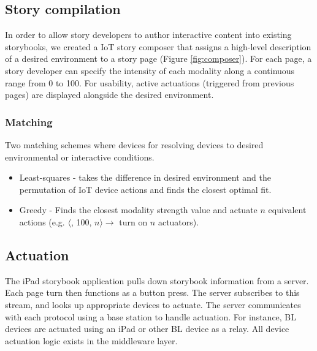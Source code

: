 \documentclass{sigchi}
\newcommand*{\quoted}[1]{{\small{\fontfamily{cmss}\selectfont{#1}}}}
\begin{document}
\subsection{Story compilation}
In order to allow story developers to author interactive content into existing storybooks, we created a IoT story composer that assigns a high-level description of a desired environment to a story page (Figure \ref{fig:composer}). For each page, a story developer can specify the intensity of each modality along a continuous range from 0 to 100. For usability, active actuations (triggered from previous pages) are displayed alongside the desired environment.

\subsubsection{Matching}
Two matching schemes where devices for resolving devices to desired environmental or interactive conditions. 
\begin{itemize}
\item Least-squares - takes the difference in desired environment and the permutation of IoT device actions and finds the closest optimal fit. 
\item Greedy - Finds the closest modality strength value and actuate $n$ equivalent actions (e.g. $\langle$\quoted{light}, 100, $n \rangle \rightarrow$ turn on $n$ \quoted{light} actuators). 

\end{itemize}
\subsection{Actuation}
The iPad storybook application pulls down storybook information from a server. Each page turn then functions as a button press. The server subscribes to this stream, and looks up appropriate devices to actuate. 
The server communicates with each protocol using a base station to handle actuation. For instance, BL devices are actuated using an iPad or other BL device as a relay. All device actuation logic exists in the middleware layer. 

 
\end{document}
